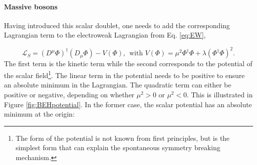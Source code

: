 \paragraph{Massive bosons}
Having introduced this scalar doublet, one needs to add the corresponding Lagrangian term to the electroweak Lagrangian from Eq. \ref{eq:EW}, 

\begin{equation}
\label{eq:higgslagrangian}
\mathcal{L}_S = \left(D^\mu\Phi\right)^\dagger \left(D_\mu \Phi\right) - V\left(\Phi\right), \ \ \textrm{with } V\left(\Phi\right) = \mu^2 \Phi^\dagger\Phi + \lambda \left(\Phi^\dagger \Phi\right)^2. 
\end{equation}
\noindent The first term is the kinetic term while the second corresponds to the potential of the scalar field\footnote{The form of the potential is not known from first principles, but is the simplest form that can explain the spontaneous symmetry breaking mechanism.}. The linear term in the potential needs to be positive to ensure an absolute minimum in the Lagrangian. The quadratic term can either be positive or negative, depending on whether $\mu^2 > 0$ or $\mu^2 < 0$. This is illustrated in Figure \ref{fig:BEHpotential}. In the former case, the scalar potential has an absolute minimum at the origin:

